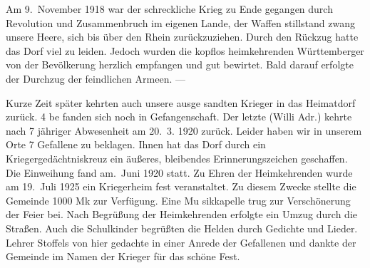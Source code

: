 

\pstart
Am 9.\ November 1918 war der schreckliche\ob
Krieg zu Ende gegangen durch Revolution und\ob
Zusammenbruch im eigenen Lande, der Waffen\ohb
stillstand zwang unsere Heere, sich bis über\ob
den Rhein zurückzuziehen. Durch den Rückzug hatte\ob
das Dorf viel zu leiden. Jedoch wurden die kopflos\ob
heimkehrenden Württemberger von der Bevölkerung\ob
herzlich empfangen und gut bewirtet. Bald darauf\ob
erfolgte der Durchzug der feindlichen Armeen. —

Kurze Zeit später kehrten auch unsere ausge\ohb
sandten Krieger in das Heimatdorf zurück. 4 be\ohb
fanden sich noch in Gefangenschaft. Der letzte (Willi Adr.\unsicher)\ob
kehrte nach 7 jähriger Abwesenheit am 20.\ 3. 1920\ob
zurück. Leider haben wir in unserem Orte 7\ob
Gefallene zu beklagen. Ihnen hat das Dorf durch\ob
ein Kriegergedächtniskreuz ein äußeres, bleibendes\ob
Erinnerungszeichen geschaffen. Die Einweihung fand am.\ Juni\unsicher{} 1920 statt. Zu Ehren der Heimkehrenden\ob
wurde am 19.\ Juli 1925 ein Kriegerheim\ohb
fest veranstaltet. Zu diesem Zwecke stellte\ob
die Gemeinde 1000 Mk zur Verfügung. Eine Mu\ohb
sikkapelle trug zur Verschönerung der Feier bei.\ob
Nach Begrüßung der Heimkehrenden erfolgte ein\ob
Umzug durch die Straßen. Auch die Schulkinder\ob
begrüßten die Helden durch Gedichte und Lieder.\ob
Lehrer Stoffels von hier gedachte in einer Anrede\ob
der Gefallenen und dankte der Gemeinde im\ob
Namen der Krieger für das schöne Fest.
\pend
